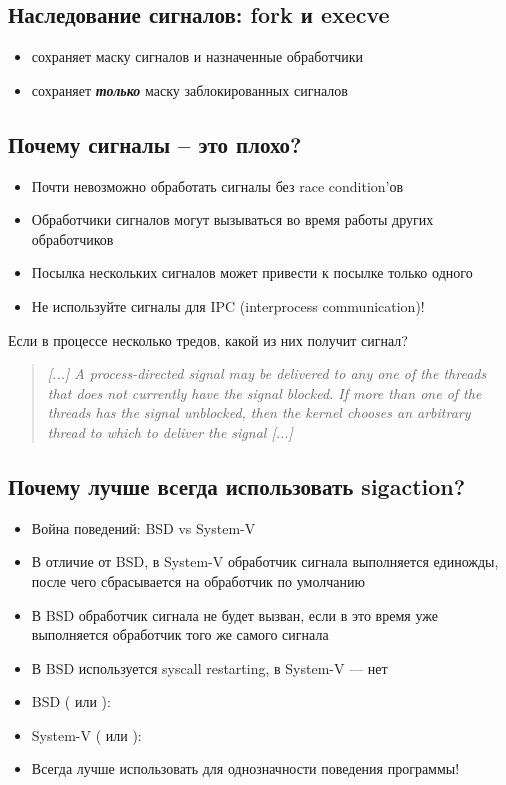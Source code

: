   \subsection{Наследование сигналов: fork и execve}
    \begin{itemize}
      \item {} сохраняет маску сигналов и назначенные обработчики
      \item {} сохраняет \textbf{\textit{только}} маску заблокированных сигналов
    \end{itemize}
  
  \subsection{Почему сигналы -- это плохо?}
    \begin{itemize}
      \item Почти невозможно обработать сигналы без race condition'ов
      \item Обработчики сигналов могут вызываться во время работы других обработчиков
      \item Посылка нескольких сигналов может привести к посылке только одного
      \item Не используйте сигналы для IPC (interprocess communication)!
    \end{itemize}
  
  Если в процессе несколько тредов, какой из них получит сигнал?
\begin{quote}\itshape
[...] A process-directed signal may be delivered to any one of the
threads that does not currently have the signal blocked.  If more
than one of the threads has the signal unblocked, then the kernel
chooses an arbitrary thread to which to deliver the signal [...]
\end{quote}

  \subsection{Почему лучше всегда использовать sigaction?}
    \begin{itemize}
      \item Война поведений: BSD vs System-V
      \item В отличие от BSD, в System-V обработчик сигнала выполняется единожды, после чего сбрасывается на обработчик по умолчанию
      \item В BSD обработчик сигнала не будет вызван, если в это время уже выполняется обработчик того же самого сигнала
      \item В BSD используется syscall restarting, в System-V — нет
      \item BSD ( или ): 
      \item System-V ( или ): 
      \item Всегда лучше использовать  для однозначности поведения программы!
    \end{itemize}
  
